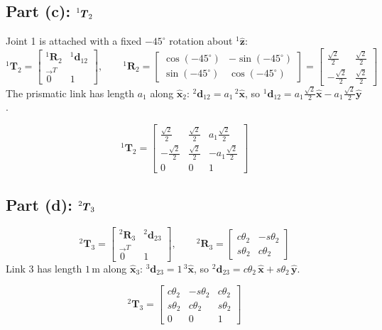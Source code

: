 \documentclass[11pt]{article}
\newcommand{\T}{\bm{T}}
\newcommand{\R}{\bm{R}}
\newcommand{\dvec}{\bm{d}}
\begin{document}
\subsection*{Part (c): $\prescript{1}{}{\T}_{2}$}
Joint 1 is attached with a fixed $-45^\circ$ rotation about $^{1}\hat{\bm z}$:
\[
    ^{1}\T_2 = \begin{bmatrix}^{1}\R_2 & ^{1}\dvec_{12} \\ \vec 0^{T} & 1\end{bmatrix}, \qquad
    ^{1}\R_2 = \begin{bmatrix}\cos(-45^\circ) & -\sin(-45^\circ) \\ \sin(-45^\circ) & \cos(-45^\circ)\end{bmatrix} = \begin{bmatrix}\tfrac{\sqrt2}{2} & \tfrac{\sqrt2}{2} \\ -\tfrac{\sqrt2}{2} & \tfrac{\sqrt2}{2}\end{bmatrix}
\]
The prismatic link has length $a_1$ along $\hat{\bm x}_2$: $^{2}\dvec_{12} = a_1\,{}^{2}\hat{\bm x}$, so $^{1}\dvec_{12} = a_1\tfrac{\sqrt2}{2}\hat{\bm x} - a_1\tfrac{\sqrt2}{2}\hat{\bm y}$.
\begin{result}
\[
    ^{1}\T_2 = \begin{bmatrix}\tfrac{\sqrt2}{2} & \tfrac{\sqrt2}{2} & a_1\tfrac{\sqrt2}{2} \\ -\tfrac{\sqrt2}{2} & \tfrac{\sqrt2}{2} & -a_1\tfrac{\sqrt2}{2} \\ 0 & 0 & 1\end{bmatrix}
\]
\end{result}

\subsection*{Part (d): $\prescript{2}{}{\T}_{3}$}
\[
    ^{2}\T_3 = \begin{bmatrix}^{2}\R_3 & ^{2}\dvec_{23} \\ \vec 0^{T} & 1\end{bmatrix}, \qquad
    ^{2}\R_3 = \begin{bmatrix}c\theta_2 & -s\theta_2 \\ s\theta_2 & c\theta_2\end{bmatrix}
\]
Link 3 has length $1\,$m along $\hat{\bm x}_3$: $^{3}\dvec_{23} = 1\,{}^{3}\hat{\bm x}$, so $^{2}\dvec_{23} = c\theta_2\,\hat{\bm x} + s\theta_2\,\hat{\bm y}$.
\begin{result}
\[
    ^{2}\T_3 = \begin{bmatrix}c\theta_2 & -s\theta_2 & c\theta_2 \\ s\theta_2 & c\theta_2 & s\theta_2 \\ 0 & 0 & 1\end{bmatrix}
\]
\end{result}
\end{document}
